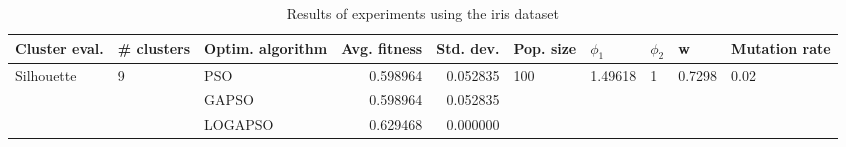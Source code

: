 \begin{table}
\centering
\caption{Results of experiments using the iris dataset}
\begin{tabular}{lllrrlllll}
\toprule
              Cluster eval. &        \# clusters & Optim. algorithm &  Avg. fitness &  Std. dev. &            Pop. size &               $\phi_{1}$ &         $\phi_{2}$ &                       w &         Mutation rate \\
\midrule
\multirow{3}{*}{Silhouette} & \multirow{3}{*}{9} &              PSO &      0.598964 &   0.052835 & \multirow{3}{*}{100} & \multirow{3}{*}{1.49618} & \multirow{3}{*}{1} & \multirow{3}{*}{0.7298} & \multirow{3}{*}{0.02} \\
                            &                    &            GAPSO &      0.598964 &   0.052835 &                      &                          &                    &                         &                       \\
                            &                    &          LOGAPSO &      0.629468 &   0.000000 &                      &                          &                    &                         &                       \\
\bottomrule
\end{tabular}
\end{table}
